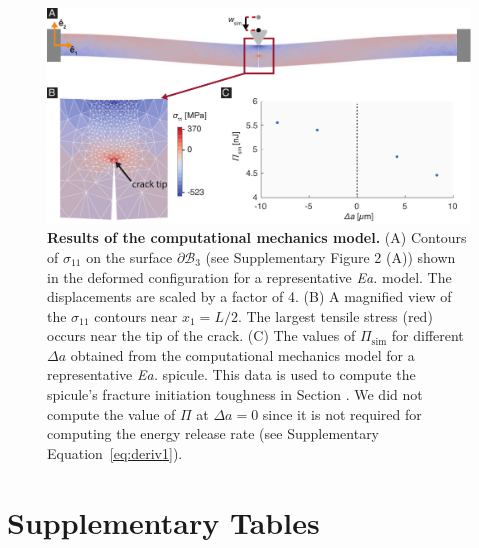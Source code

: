 \documentclass[12pt,onecolumn]{article}
\makeatletter
\DeclareRobustCommand*{\nameref}[1]{%
      \emph{\myorg@nameref{#1}}%
    }%
\newcommand{\EA}{\textit{Ea.\@}\xspace}
\makeatother
\begin{document}
\begin{bibunit}
	\begin{figure}[H]
	\centering
	\includegraphics[width=\textwidth]{../Figures/FigureFEA2/FigureA3_V1.pdf}
	\caption{\textbf{Results of the computational mechanics model.} (A) Contours of $\sigma_{11}$ on the surface $\partial \mathcal{B}_3$ (see Supplementary Figure 2 (A)) shown in the deformed configuration for a representative \EA model. The displacements are scaled by a factor of 4. (B) A magnified view of the $\sigma_{11}$ contours near $x_1=L/2$. The largest tensile stress (red) occurs near the tip of the crack. (C) The values of $\Pi_\mathrm{sim}$ for different $\Delta a$ obtained from the computational mechanics model for a representative \EA spicule. This data is used to compute the spicule's fracture initiation toughness in Section \nameref{sec:Gc}. We did not compute the value of $\Pi$ at $\Delta a=0$ since it is not required for computing the energy release rate (see Supplementary Equation~\eqref{eq:deriv1}).}
	\label{fig:FEA2}
	\end{figure}

\section*{Supplementary Tables}


\end{bibunit}
\end{document}
